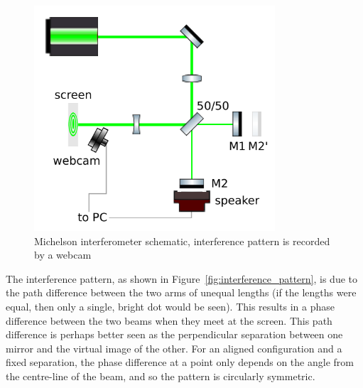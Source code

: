 \documentclass[prb,preprint]{revtex4-1}
\begin{document}
\begin{figure}
	\includegraphics[width=0.8\textwidth]{figures/ifo_schematic_webcam.pdf}
	\caption{Michelson interferometer schematic, interference pattern is recorded by a webcam}
	\label{fig:ifo_schematic_webcam}
\end{figure}

The interference pattern, as shown in Figure~\ref{fig:interference_pattern}, is due to the path difference between the two arms of unequal lengths (if the lengths were equal, then only a single, bright dot would be seen). This results in a phase difference between the two beams when they meet at the screen. This path difference is perhaps better seen as the perpendicular separation between one mirror and the virtual image of the other.
For an aligned configuration and a fixed separation, the phase difference at a point only depends on the angle from the centre-line of the beam, and so the pattern is circularly symmetric.
\end{document}

